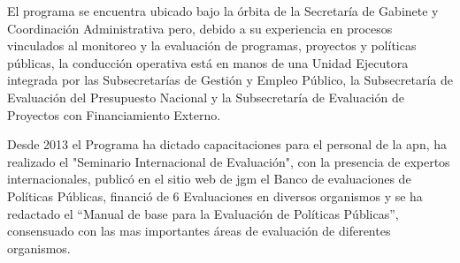 El programa se encuentra ubicado bajo la órbita de la Secretaría de Gabinete y Coordinación Administrativa pero, debido a su experiencia en procesos vinculados al monitoreo y la evaluación de programas, proyectos y políticas públicas, la conducción operativa está en manos de una Unidad Ejecutora integrada por las Subsecretarías de Gestión y Empleo Público, la Subsecretaría de Evaluación del Presupuesto Nacional y la Subsecretaría de Evaluación de Proyectos con Financiamiento Externo.




Desde 2013 el Programa ha dictado capacitaciones para el personal de la \ac{apn}, ha realizado el "Seminario Internacional de Evaluación", con la presencia de expertos internacionales,  publicó en el sitio web de \ac{jgm} el Banco de evaluaciones de Políticas Públicas, financió de 6 Evaluaciones en diversos organismos y se ha redactado el “Manual de base para la Evaluación de Políticas Públicas”, consensuado con las mas importantes áreas de evaluación de diferentes organismos.


